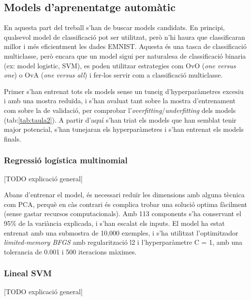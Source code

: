\documentclass[12pt, spanish]{article}
\begin{document}
\subsection{Models d'aprenentatge automàtic}


En aquesta part del treball s'han de buscar models candidats. En principi, qualsevol model de classificació pot ser utilitzat, però n'hi haura que classificaran millor i més eficientment les dades EMNIST. Aquesta és una tasca de classificació multiclasse, però encara que un model sigui per naturalesa de classificació binaria (ex: model logistic, SVM), es poden utilitzar estrategies com OvO (\textit{one versus one}) o OvA (\textit{one versus all}) i fer-los servir com a classificació multiclasse. 

Primer s'han entrenat tots els models sense un tuneig d'hyperparàmetres excesiu i amb una mostra reduïda, i s'han avaluat tant sobre la mostra d'entrenament com sobre la de validació, per comprobar l'\textit{overfitting}/\textit{underfitting} dels models (tab:\ref{tab:taula2}). A partir d'aquí s'han triat els models que han semblat tenir major potencial, s'han tunejaran els hyperparàmetres i s'han entrenat els models finals. 

\subsubsection{Regressió logística multinomial}

[TODO explicació general]

Abans d'entrenar el model, és necessari reduïr les dimensions amb alguna tècnica com PCA, perquè en càs contrari és complica trobar una solució optima fàcilment (sense gastar recursos computacionals). Amb 113 components s'ha conservant el 95\% de la variància explicada, i s'han escalat els inputs. El model ha estat entrenat amb una submostra de 10,000 exemples, i s'ha utilitzat l'optimitzador \textit{limited-memory BFGS} amb regularització l2 i l'hyperparàmetre C = 1, amb una tolerancia de 0.001 i 500 iteracions màximes.

\subsubsection{Lineal SVM}

[TODO explicació general]
\end{document}
